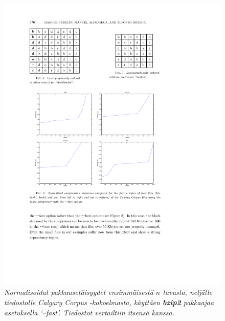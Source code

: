 \documentclass[12pt,finnish]{tktltiki2}
\theoremstyle{definition}
\theoremstyle{remark}
\begin{document}
    \begin{figure}[!htb]
      \includegraphics[width=\textwidth]{img/bzip2-fast}
      \caption{\emph{Normalisoidut pakkausetäisyydet ensimmäisestä $n$ tavusta, neljälle tiedostolle Calgary Corpus -kokoelmasta, käyttäen \textbf{bzip2} pakkaajaa asetuksella `--fast'. Tiedostot vertailtiin itsensä kanssa.} \cite{cebrian2005common}}
      \label{fig:bzip2-fast}
    \end{figure}
\end{document}
